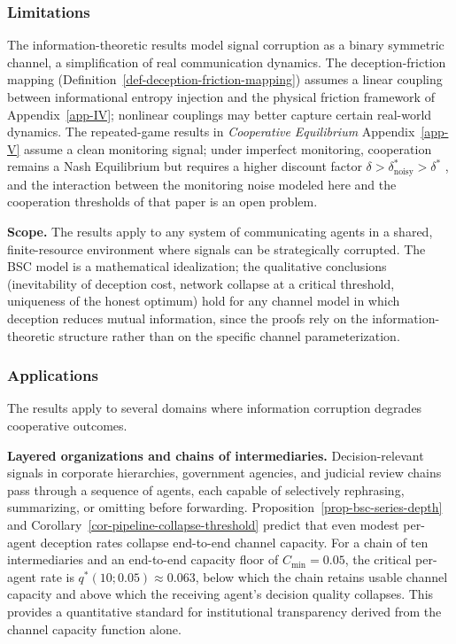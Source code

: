 \documentclass[11pt]{article}
\theoremstyle{plain}
\theoremstyle{definition}
\theoremstyle{remark}
\let\origsubsubsection\subsubsection
\renewcommand{\subsubsection}{\needspace{4\baselineskip}\origsubsubsection}
\begin{document}
\subsubsection{Limitations}\label{limitations-1}

The information-theoretic results model signal corruption as a binary
symmetric channel, a simplification of real communication dynamics. The
deception-friction mapping
(Definition~\ref{def-deception-friction-mapping}) assumes a linear
coupling between informational entropy injection and the physical
friction framework of Appendix~\ref{app-IV}; nonlinear couplings may
better capture certain real-world dynamics. The repeated-game results in
\emph{Cooperative Equilibrium} Appendix~\ref{app-V} assume a clean
monitoring signal; under imperfect monitoring, cooperation remains a
Nash Equilibrium but requires a higher discount factor
\(\delta > \delta^*_{\text{noisy}} > \delta^*\)
\citep{Fudenberg1994, GreenPorter1984}, and the interaction between the
monitoring noise modeled here and the cooperation thresholds of that
paper is an open problem.

\textbf{Scope.} The results apply to any system of communicating agents
in a shared, finite-resource environment where signals can be
strategically corrupted. The BSC model is a mathematical idealization;
the qualitative conclusions (inevitability of deception cost, network
collapse at a critical threshold, uniqueness of the honest optimum) hold
for any channel model in which deception reduces mutual information,
since the proofs rely on the information-theoretic structure rather than
on the specific channel parameterization.

\subsubsection{Applications}\label{applications-1}

The results apply to several domains where information corruption
degrades cooperative outcomes.

\textbf{Layered organizations and chains of intermediaries.}
Decision-relevant signals in corporate hierarchies, government agencies,
and judicial review chains pass through a sequence of agents, each
capable of selectively rephrasing, summarizing, or omitting before
forwarding. Proposition~\ref{prop-bsc-series-depth} and
Corollary~\ref{cor-pipeline-collapse-threshold} predict that even modest
per-agent deception rates collapse end-to-end channel capacity. For a
chain of ten intermediaries and an end-to-end capacity floor of
\(C_{\min} = 0.05\), the critical per-agent rate is
\(q^*(10; 0.05) \approx 0.063\), below which the chain retains usable
channel capacity and above which the receiving agent's decision quality
collapses. This provides a quantitative standard for institutional
transparency derived from the channel capacity function alone.
\end{document}
